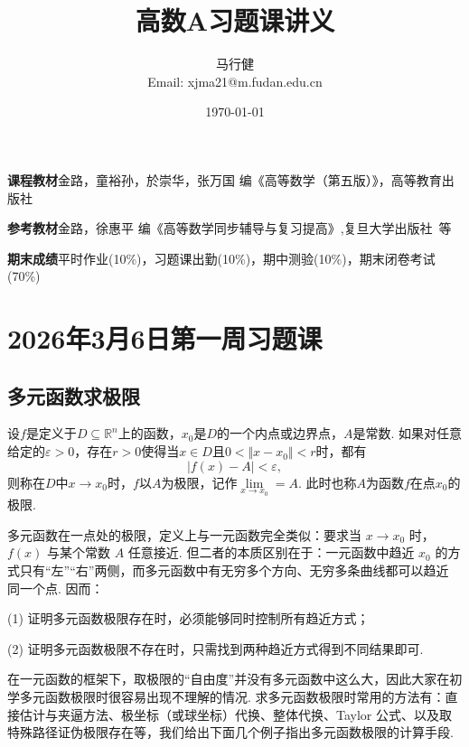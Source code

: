 \documentclass{ctexart}
\title{高数A习题课讲义}
\author{马行健\\ Email: xjma21@m.fudan.edu.cn}
\date{\today}
\begin{document}
\maketitle
\vspace{-2em}
\textbf{课程教材}\quad 金路，童裕孙，於崇华，张万国\,\,编《高等数学（第五版）》，高等教育出版社

\textbf{参考教材}\quad 金路，徐惠平\,\,编《高等数学同步辅导与复习提高》,复旦大学出版社\ 等

\textbf{期末成绩}\quad 平时作业(10\%)，习题课出勤(10\%)，期中测验(10\%)，期末闭卷考试(70\%)

\renewcommand{\contentsname}{\hspace*{\fill}\Large\bfseries 目\quad 录 \hspace*{\fill}}
\setcounter{tocdepth}{2}
\tableofcontents 


\clearpage
\pagestyle{fancy}
\section{2026年3月6日第一周习题课}
\subsection{多元函数求极限}
\begin{definition}[多元函数的极限]
设$f$是定义于$D\subseteq\mathbb{R}^{n}$上的函数，$x_{0}$是$D$的一个内点或边界点，$A$是常数. 如果对任意给定的$\varepsilon>0$，存在$r>0$使得当$x\in D$且$0<\Vert x-x_{0}\Vert <r$时，都有
$$|f(x)-A|<\varepsilon,$$
则称在$D$中$x\to x_{0}$时，$f$以$A$为极限，记作$\lim\limits_{x\to x_{0}}=A$. 此时也称$A$为函数$f$在点$x_{0}$的极限.
\end{definition}

多元函数在一点处的极限，定义上与一元函数完全类似：要求当 $x\to x_0$ 时，
$f(x)$ 与某个常数 $A$ 任意接近. 但二者的本质区别在于：一元函数中趋近 $x_0$
的方式只有“左”“右”两侧，而多元函数中有无穷多个方向、无穷多条曲线都可以趋近
同一个点. 因而：

(1) 证明多元函数极限存在时，必须能够同时控制所有趋近方式；

(2) 证明多元函数极限不存在时，只需找到两种趋近方式得到不同结果即可.

在一元函数的框架下，取极限的“自由度”并没有多元函数中这么大，因此大家在初学多元函数极限时很容易出现不理解的情况. 求多元函数极限时常用的方法有：直接估计与夹逼方法、极坐标（或球坐标）代换、整体代换、Taylor 公式、以及取特殊路径证伪极限存在等，我们给出下面几个例子指出多元函数极限的计算手段.
\end{document}
